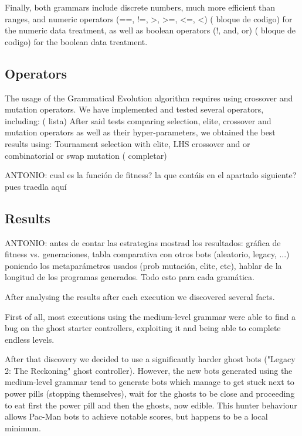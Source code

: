 \documentclass{llncs}
\newcommand{\paco}{Pac-Man }
\begin{document}
Finally, both grammars include discrete numbers, much more efficient than ranges, and numeric operators (==, !=, >, >=, <=, <) ({\color{red} bloque de codigo}) for the numeric data treatment, as well as boolean operators (!, and, or) ({\color{red} bloque de codigo}) for the boolean data treatment.

\subsection{Operators}
The usage of the Grammatical Evolution algorithm requires using crossover and mutation operators. We have implemented and tested several operators, including: ({\color{red} lista})
After said tests comparing selection, elite, crossover and mutation operators as well as their hyper-parameters, we obtained the best results using: Tournament selection with elite, LHS crossover and or combinatorial or swap mutation ({\color{red} completar})

{\color{red}ANTONIO: cual es la función de fitness? la que contáis en el apartado siguiente? pues traedla aquí}

\subsection{Results}

{\color{red}ANTONIO: antes de contar las estrategias mostrad los resultados: gráfica de fitness vs. generaciones, tabla comparativa con otros bots (aleatorio, legacy, ...) poniendo los metaparámetros usados (prob mutación, elite, etc), hablar de la longitud de los programas generados. Todo esto para cada gramática. }

After analysing the results after each execution we discovered several facts. 

First of all, most executions using the medium-level grammar were able to find a bug on the ghost starter controllers, exploiting it and being able to complete endless levels.

After that discovery we decided to use a significantly harder ghost bots ("Legacy 2: The Reckoning" ghost controller). However, the new bots generated using the medium-level grammar tend to generate bots which manage to get stuck next to power pills (stopping themselves), wait for the ghosts to be close and proceeding to eat first the power pill and then the ghosts, now edible. This hunter behaviour allows \paco bots to achieve notable scores, but happens to be a local minimum.
\end{document}
